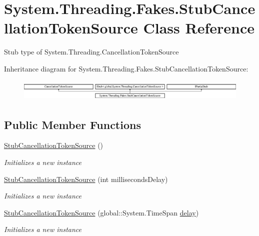 \hypertarget{class_system_1_1_threading_1_1_fakes_1_1_stub_cancellation_token_source}{\section{System.\-Threading.\-Fakes.\-Stub\-Cancellation\-Token\-Source Class Reference}
\label{class_system_1_1_threading_1_1_fakes_1_1_stub_cancellation_token_source}
}


Stub type of System.\-Threading.\-Cancellation\-Token\-Source 


Inheritance diagram for System.\-Threading.\-Fakes.\-Stub\-Cancellation\-Token\-Source\-:\begin{figure}[H]
\begin{center}
\leavevmode
\includegraphics[height=1.037037cm]{class_system_1_1_threading_1_1_fakes_1_1_stub_cancellation_token_source}
\end{center}
\end{figure}
\subsection*{Public Member Functions}
\begin{DoxyCompactItemize}
\item 
\hyperlink{class_system_1_1_threading_1_1_fakes_1_1_stub_cancellation_token_source_aad46e1c7ee82dc3bb2007ddd162c2603}{Stub\-Cancellation\-Token\-Source} ()
\begin{DoxyCompactList}\small\item\em Initializes a new instance\end{DoxyCompactList}\item 
\hyperlink{class_system_1_1_threading_1_1_fakes_1_1_stub_cancellation_token_source_a8cccc4aed1ced85266efaeee5918a369}{Stub\-Cancellation\-Token\-Source} (int milliseconds\-Delay)
\begin{DoxyCompactList}\small\item\em Initializes a new instance\end{DoxyCompactList}\item 
\hyperlink{class_system_1_1_threading_1_1_fakes_1_1_stub_cancellation_token_source_a4ef3cdb64de9206906447adb67d88229}{Stub\-Cancellation\-Token\-Source} (global\-::\-System.\-Time\-Span \hyperlink{jquery-1_810_82-vsdoc_8js_a90055e3b93c579a9e3f764ee3c04639a}{delay})
\begin{DoxyCompactList}\small\item\em Initializes a new instance\end{DoxyCompactList}\end{DoxyCompactItemize}
